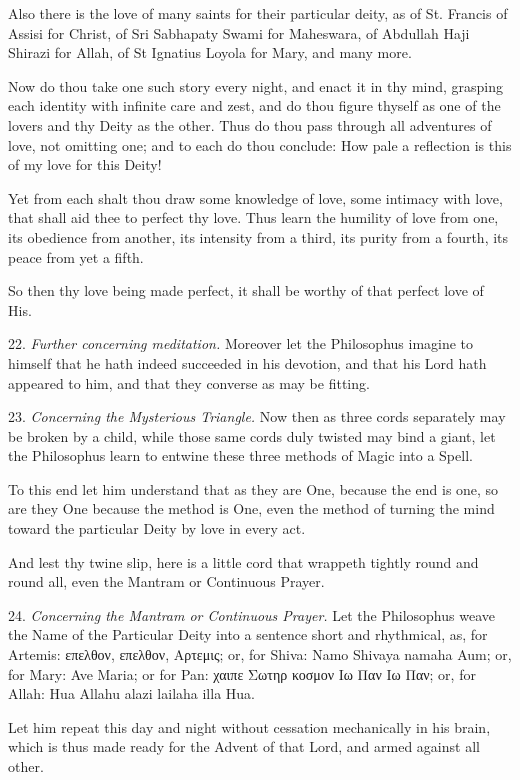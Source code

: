Also there is the love of many saints for their particular deity, as of St. Francis of Assisi for Christ, of Sri Sabhapaty Swami for Maheswara, of Abdullah Haji Shirazi for Allah, of St Ignatius Loyola for Mary, and many more.

Now do thou take one such story every night, and enact it in thy mind, grasping each identity with infinite care and zest, and do thou figure thyself as one of the lovers and thy Deity as the other. Thus do thou pass through all adventures of love, not omitting one; and to each do thou conclude: How pale a reflection is this of my love for this Deity!

Yet from each shalt thou draw some knowledge of love, some intimacy with love, that shall aid thee to perfect thy love. Thus learn the humility of love from one, its obedience from another, its intensity from a third, its purity from a fourth, its peace from yet a fifth.

So then thy love being made perfect, it shall be worthy of that perfect love of His.

22. \textit{Further concerning meditation.} Moreover let the Philosophus imagine to himself that he hath indeed succeeded in his devotion, and that his Lord hath appeared to him, and that they converse as may be fitting.

23. \textit{Concerning the Mysterious Triangle.} Now then as three cords separately may be broken by a child, while those same cords duly twisted may bind a giant, let the Philosophus learn to entwine these three methods of Magic into a Spell.

To this end let him understand that as they are One, because the end is one, so are they One because the method is One, even the method of turning the mind toward the particular Deity by love in every act.

And lest thy twine slip, here is a little cord that wrappeth tightly round and round all, even the Mantram or Continuous Prayer.

24. \textit{Concerning the Mantram or Continuous Prayer.} Let the Philosophus weave the Name of the Particular Deity into a sentence short and rhythmical, as, for Artemis: επελθον, επελθον, Αρτεμις; or, for Shiva: Namo Shivaya namaha Aum; or, for Mary: Ave Maria; or for Pan: χαιπε Σωτηρ κοσμον Ιω Παν Ιω Παν; or, for Allah: Hua Allahu alazi lailaha illa Hua.

Let him repeat this day and night without cessation mechanically in his brain, which is thus made ready for the Advent of that Lord, and armed against all other.


